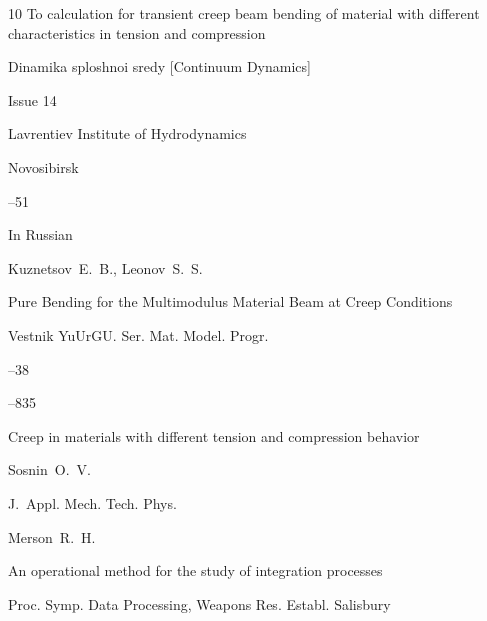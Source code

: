 \begin{thebibliography}{10}
\paper To calculation for transient creep beam bending of material with different characteristics in tension and compression

\inbook Dinamika sploshnoi sredy \rm [Continuum Dynamics]

\issueinfo Issue 14

\publ Lavrentiev Institute of Hydrodynamics

\publaddr Novosibirsk


--51










\lang In Russian

\by Kuznetsov~E.~B., Leonov~S.~S.

\paper Pure Bending for the Multimodulus Material Beam at Creep Conditions

\jour Vestnik YuUrGU. Ser. Mat. Model. Progr.




--38









–835 

\paper Creep in materials with different tension and compression behavior

\by Sosnin~O.~V.

\jour  J.~Appl. Mech. Tech. Phys.













\by Merson~R.~H.

\paper An operational method for the study of integration processes

\inbook Proc. Symp. Data Processing, Weapons Res. Establ. Salisbury



\end{thebibliography}
